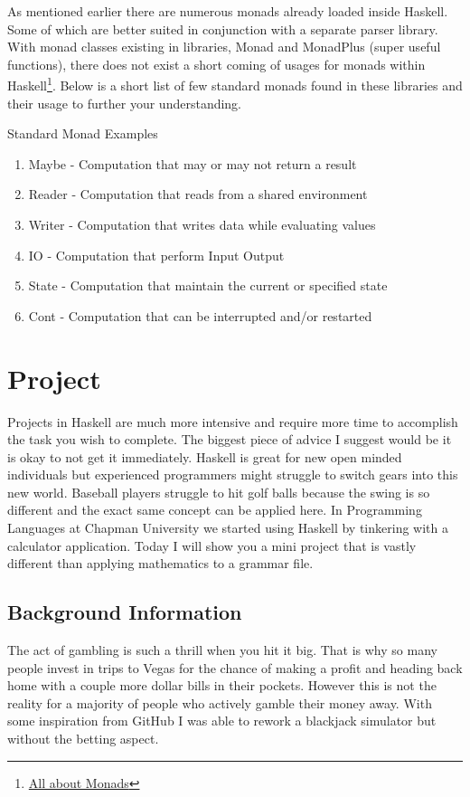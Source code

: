 \documentclass{article}
\begin{document}
\medskip\noindent As mentioned earlier there are numerous monads already loaded inside Haskell. Some of which are better suited in conjunction with a separate parser library. With monad classes existing in libraries, Monad and MonadPlus (super useful functions), there does not exist a short coming of usages for monads within Haskell\footnote{\href{https://wiki.haskell.org/All_About_Monads}{All about Monads}}. Below is a short list of few standard monads found in these libraries and their usage to further your understanding.

\medskip
\caption{Standard Monad Examples}
\begin{enumerate}
    \item Maybe - Computation that may or may not return a result
    \item Reader - Computation that reads from a shared environment
    \item Writer - Computation that writes data while evaluating values
    \item IO - Computation that perform Input Output
    \item State - Computation that maintain the current or specified state
    \item Cont - Computation that can be interrupted and/or restarted
\end{enumerate}
    

\section{Project}

Projects in Haskell are much more intensive and require more time to accomplish the task you wish to complete. The biggest piece of advice I suggest would be it is okay to not get it immediately. Haskell is great for new open minded individuals but experienced programmers might struggle to switch gears into this new world. Baseball players struggle to hit golf balls because the swing is so different and the exact same concept can be applied here. In Programming Languages at Chapman University we started using Haskell by tinkering with a calculator application. Today I will show you a mini project that is vastly different than applying mathematics to a grammar file. 
    
    \subsection{Background Information}
    The act of gambling is such a thrill when you hit it big. That is why so many people invest in trips to Vegas for the chance of making a profit and heading back home with a couple more dollar bills in their pockets. However this is not the reality for a majority of people who actively gamble their money away. With some inspiration from GitHub I was able to rework a blackjack simulator but without the betting aspect. 
    
\end{document}
